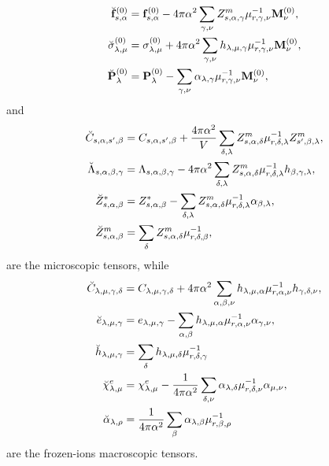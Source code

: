 \documentclass[12pt,a4paper]{article}
\begin{document}
{\begin{align}
\breve {\bf f}^{(0)}_{s,\alpha}&= {\bf f}^{(0)}_{s,\alpha} - 4 \pi
\alpha^2
\sum_{\gamma,\nu}
Z^m_{s,\alpha,\gamma} \mu^{-1}_{r,\gamma,\nu} {\bf M}^{(0)}_\nu, \\
\breve \sigma^{(0)}_{\lambda,\mu}&= \sigma^{(0)}_{\lambda,\mu}
+4 \pi \alpha^2 \sum_{\gamma,\nu} h_{\lambda,\mu,\gamma} \mu^{-1}_{r,\gamma,\nu} 
{\bf M}^{(0)}_\nu, \\
\breve {\bf P}^{(0)}_\lambda&= {\bf P}^{(0)}_\lambda -
\sum_{\gamma,\nu} \alpha_{\lambda,\gamma} \mu^{-1}_{r,\gamma,\nu} 
{\bf M}^{(0)}_\nu, 
\end{align}
and
\begin{align}
\breve C_{s,\alpha,s',\beta} &= C_{s,\alpha,s',\beta}+
{4 \pi \alpha^2 \over V}  \sum_{\delta,\lambda} Z^m_{s,\alpha,\delta}
\mu^{-1}_{r,\delta,\lambda}Z^m_{s',\beta,\lambda},\\
\breve \Lambda_{s,\alpha,\beta,\gamma} &= \Lambda_{s,\alpha,\beta,\gamma}
- 4 \pi \alpha^2 \sum_{\delta,\lambda} Z^m_{s,\alpha,\delta}
\mu^{-1}_{r,\delta,\lambda} h_{\beta,\gamma,\lambda}, \\
\breve Z^*_{s,\alpha,\beta} &= Z^*_{s,\alpha,\beta}
-\sum_{\delta,\lambda} Z^m_{s,\alpha,\delta} 
\mu^{-1}_{r,\delta,\lambda} \alpha_{\beta,\lambda}, \\
\breve Z^m_{s,\alpha,\beta} &= \sum_{\delta} Z^m_{s,\alpha,\delta} 
\mu^{-1}_{r,\delta,\beta}, 
\end{align}
are the microscopic tensors, while
\begin{align}
\breve C_{\lambda,\mu,\gamma,\delta} &=
C_{\lambda,\mu,\gamma,\delta} + 4 \pi \alpha^2 \sum_{\alpha,\beta,\nu}
h_{\lambda,\mu,\alpha} \mu^{-1}_{r,\alpha,\nu} 
h_{\gamma,\delta,\nu}, \\
\breve e_{\lambda,\mu,\gamma}&= e_{\lambda,\mu,\gamma}
-\sum_{\alpha,\beta} h_{\lambda,\mu,\alpha} \mu^{-1}_{r,\alpha,\nu}
\alpha_{\gamma,\nu}, \\
\breve h_{\lambda,\mu,\gamma}&= \sum_\delta h_{\lambda,\mu,\delta}
\mu^{-1}_{r,\delta,\gamma} \\
\breve \chi^e_{\lambda,\mu}&= \chi^e_{\lambda,\mu}
-{1\over 4 \pi \alpha^2} \sum_{\delta,\nu} \alpha_{\lambda,\delta} 
\mu^{-1}_{r,\delta,\nu} \alpha_{\mu,\nu}, \\
\breve \alpha_{\lambda,\rho} &= {1\over 4 \pi \alpha^2}
\sum_\beta \alpha_{\lambda,\beta}
\mu^{-1}_{r,\beta,\rho}
\end{align}
are the frozen-ions macroscopic tensors.
}
\\
\end{document}
